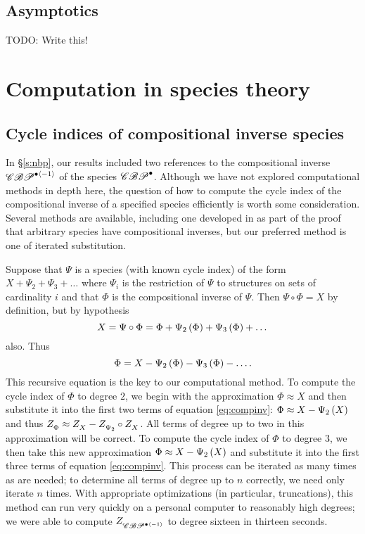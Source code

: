 \documentclass[sectionflow,singlespace,twoside,boldmathhdr,draft]{brandiss} %
\numberwithin{section}{chapter}
\numberwithin{figure}{chapter}
\begin{document}
\section{Asymptotics}
TODO: Write this!

\appendix
\chapter{Computation in species theory}\label{c:comp}
\section{Cycle indices of compositional inverse species}\label{s:compinv}
In \S \ref{s:nbp}, our results included two references to the compositional inverse $\mathscr{CBP}^{\bullet \left\langle {-1} \right\rangle}$ of the species $\mathscr{CBP}^{\bullet}$.
Although we have not explored computational methods in depth here, the question of how to compute the cycle index of the compositional inverse of a specified species efficiently is worth some consideration.
Several methods are available, including one developed in \cite[4.2.19]{bll:species} as part of the proof that arbitrary species have compositional inverses, but our preferred method is one of iterated substitution.

Suppose that $\Psi$ is a species (with known cycle index) of the form $X + \Psi_{2} + \Psi_{3} + \dots$ where $\Psi_{i}$ is the restriction of $\Psi$ to structures on sets of cardinality $i$ and that $\Phi$ is the compositional inverse of $\Psi$.
Then $\Psi \circ \Phi = X$ by definition, but by hypothesis
\begin{equation*}
  X = \Psi \circ \Phi = \Phi + \Psi_{2} \left( {\Phi} \right) + \Psi_{3} \left( {\Phi} \right) + \dots
\end{equation*}
also. Thus
\begin{equation}
  \label{eq:compinv}
  \Phi = X - \Psi_{2} \left( {\Phi} \right) - \Psi_{3} \left( {\Phi} \right) - \dots.
\end{equation}
This recursive equation is the key to our computational method.
To compute the cycle index of $\Phi$ to degree $2$, we begin with the approximation $\Phi \approx X$ and then substitute it into the first two terms of equation \eqref{eq:compinv}: $\Phi \approx X - \Psi_{2} \left( {X} \right)$ and thus $ Z_{\Phi}^{}  \approx  Z_{X}^{}  -  Z_{\Psi_{2}}^{}  \circ  Z_{X}^{} $.
All terms of degree up to two in this approximation will be correct.
To compute the cycle index of $\Phi$ to degree $3$, we then take this new approximation $\Phi \approx X - \Psi_{2} \left( {X} \right)$ and substitute it into the first three terms of equation \eqref{eq:compinv}.
This process can be iterated as many times as are needed; to determine all terms of degree up to $n$ correctly, we need only iterate $n$ times.
With appropriate optimizations (in particular, truncations), this method can run very quickly on a personal computer to reasonably high degrees; we were able to compute $ Z_{\mathscr{CBP}^{\bullet \left\langle {-1} \right\rangle}}^{} $ to degree sixteen in thirteen seconds.
\end{document}
